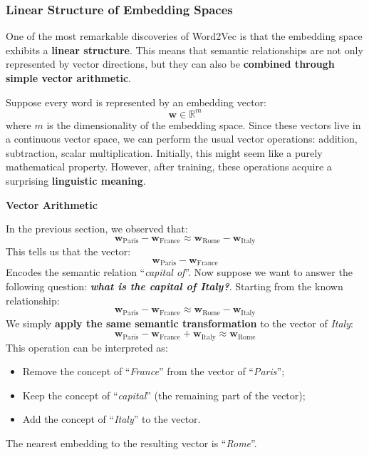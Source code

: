 \subsubsection{Linear Structure of Embedding Spaces}\label{sec:linear-structure-of-embedding-spaces}

One of the most remarkable discoveries of Word2Vec is that the embedding space exhibits a \textbf{linear structure}. This means that semantic relationships are not only represented by vector directions, but they can also be \textbf{combined through simple vector arithmetic}.

\highspace
Suppose every word is represented by an embedding vector:
\begin{equation*}
    \mathbf{w} \in \mathbb{R}^m
\end{equation*}
where $m$ is the dimensionality of the embedding space. Since these vectors live in a continuous vector space, we can perform the usual vector operations: addition, subtraction, scalar multiplication. Initially, this might seem like a purely mathematical property. However, after training, these operations acquire a surprising \textbf{linguistic meaning}.

\highspace
\begin{flushleft}
    \textcolor{Green3}{ \textbf{Vector Arithmetic}}
\end{flushleft}
In the previous section, we observed that:
\begin{equation*}
    \mathbf{w}_{\text{Paris}} - \mathbf{w}_{\text{France}} \approx \mathbf{w}_{\text{Rome}} - \mathbf{w}_{\text{Italy}}
\end{equation*}
This tells us that the vector:
\begin{equation*}
    \mathbf{w}_{\text{Paris}} - \mathbf{w}_{\text{France}}
\end{equation*}
Encodes the semantic relation ``\emph{capital of}''. Now suppose we want to answer the following question: \emph{\textbf{what is the capital of Italy?}}. Starting from the known relationship:
\begin{equation*}
    \mathbf{w}_{\text{Paris}} - \mathbf{w}_{\text{France}} \approx \mathbf{w}_{\text{Rome}} - \mathbf{w}_{\text{Italy}}
\end{equation*}
We simply \textbf{apply the same semantic transformation} to the vector of \emph{Italy}:
\begin{equation*}
    \mathbf{w}_{\text{Paris}} - \mathbf{w}_{\text{France}} + \mathbf{w}_{\text{Italy}} \approx \mathbf{w}_{\text{Rome}}
\end{equation*}
This operation can be interpreted as:
\begin{itemize}
    \item Remove the concept of ``\emph{France}'' from the vector of ``\emph{Paris}'';
    \item Keep the concept of ``\emph{capital}'' (the remaining part of the vector);
    \item Add the concept of ``\emph{Italy}'' to the vector.
\end{itemize}
The nearest embedding to the resulting vector is ``\emph{Rome}''.

